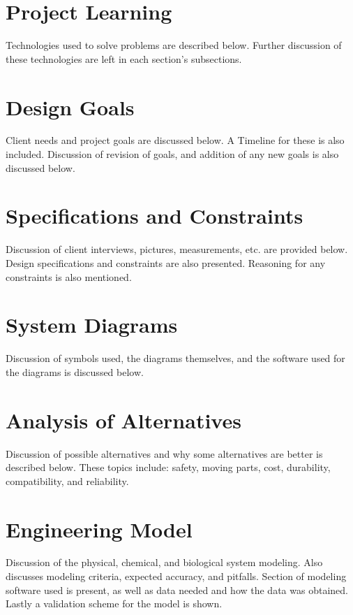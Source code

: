 \documentclass[12pt]{article}
\begin{document}
	\section{Project Learning}
	Technologies used to solve problems are described below. Further discussion of these technologies are left in each section's subsections.

	\newpage
		
	\section{Design Goals}
	Client needs and project goals are discussed below. A Timeline for these is also included. Discussion of revision of goals, and addition of any new goals is also discussed below.
	
	\newpage	
	
	\section{Specifications and Constraints}
	Discussion of client interviews, pictures, measurements, etc. are provided below. Design specifications and constraints are also presented. Reasoning for any constraints is also mentioned.
	
	\newpage
						
	\section{System Diagrams}
	Discussion of symbols used, the diagrams themselves, and the software used for the diagrams is discussed below.
	
	\newpage				
					
	\section{Analysis of Alternatives}
	Discussion of possible alternatives and why some alternatives are better is described below. These topics include: safety, moving parts, cost, durability, compatibility, and reliability.
	
	\newpage
	
	\section{Engineering Model}
	Discussion of the physical, chemical, and biological system modeling. Also discusses modeling criteria, expected accuracy, and pitfalls. Section of modeling software used is present, as well as data needed and how the data was obtained. Lastly a validation scheme for the model is shown.
	
\end{document}
